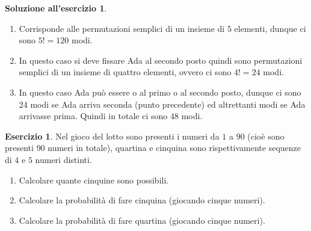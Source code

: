 \documentclass[12pt,a4paper]{article}
\theoremstyle{definition}
\newtheorem{sol}{Soluzione all'esercizio}
\newtheorem{exe}{Esercizio}
\begin{document}
\begin{sol}\mbox{}\vspace{-0.7cm}\\
	\begin{enumerate}
		\item Corrisponde alle permutazioni semplici di un insieme di $ 5 $ elementi, dunque ci sono $ 5! = 120 $ modi.
		\item In questo caso si deve fissare Ada al secondo posto quindi sono permutazioni semplici di un insieme di quattro elementi, ovvero ci sono $ 4! = 24 $ modi.
		\item In questo caso Ada può essere o al primo o al secondo posto, dunque ci sono $ 24 $ modi se Ada arriva seconda (punto precedente) ed altrettanti modi se Ada arrivasse prima. Quindi in totale ci sono $ 48 $ modi.
	\end{enumerate}
\end{sol}
\begin{exe}
	Nel gioco del lotto sono presenti i numeri da $ 1 $ a $ 90 $ (cioè sono presenti $ 90 $ numeri in totale), quartina e cinquina sono rispettivamente sequenze di  $ 4 $ e $ 5 $ numeri distinti.
	\begin{enumerate}
		\item Calcolare quante cinquine sono possibili.
		\item Calcolare la probabilità di fare cinquina (giocando cinque numeri).
		\item Calcolare la probabilità di fare quartina (giocando cinque numeri).
	\end{enumerate}
\end{exe}
\end{document}
